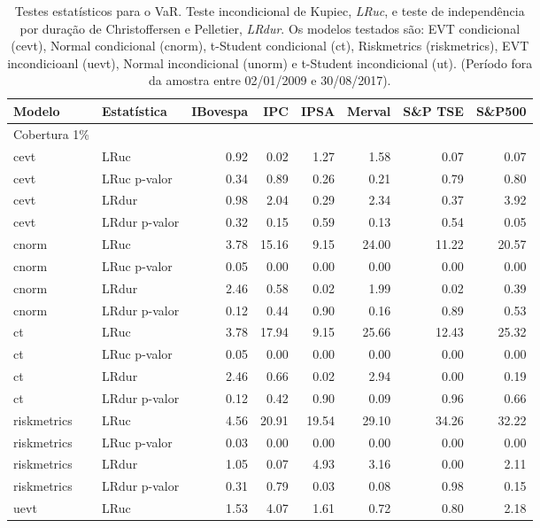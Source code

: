 \begin{longtable}{llrrrrrr}
\caption{Testes estatísticos para o VaR. Teste incondicional de Kupiec, \emph{LRuc}, e teste de
             independência por duração de Christoffersen e Pelletier, \emph{LRdur}. Os modelos testados
são: EVT condicional (cevt), Normal condicional (cnorm), t-Student condicional (ct), Riskmetrics 
(riskmetrics), EVT incondicioanl (uevt), Normal incondicional (unorm) e t-Student incondicional (ut). 
(Período fora da amostra entre 02/01/2009 e 30/08/2017).} \\ 
  \hline
Modelo & Estatística & IBovespa & IPC & IPSA & Merval & S\&P TSE & S\&P500 \\ 
  \hline
Cobertura 1\% &  &  &  &  &  &  &  \\ 
  cevt & LRuc & 0.92 & 0.02 & 1.27 & 1.58 & 0.07 & 0.07 \\ 
  cevt & LRuc p-valor & 0.34 & 0.89 & 0.26 & 0.21 & 0.79 & 0.80 \\ 
  cevt & LRdur & 0.98 & 2.04 & 0.29 & 2.34 & 0.37 & 3.92 \\ 
  cevt & LRdur p-valor & 0.32 & 0.15 & 0.59 & 0.13 & 0.54 & 0.05 \\ 
  cnorm & LRuc & 3.78 & 15.16 & 9.15 & 24.00 & 11.22 & 20.57 \\ 
  cnorm & LRuc p-valor & 0.05 & 0.00 & 0.00 & 0.00 & 0.00 & 0.00 \\ 
  cnorm & LRdur & 2.46 & 0.58 & 0.02 & 1.99 & 0.02 & 0.39 \\ 
  cnorm & LRdur p-valor & 0.12 & 0.44 & 0.90 & 0.16 & 0.89 & 0.53 \\ 
  ct & LRuc & 3.78 & 17.94 & 9.15 & 25.66 & 12.43 & 25.32 \\ 
  ct & LRuc p-valor & 0.05 & 0.00 & 0.00 & 0.00 & 0.00 & 0.00 \\ 
  ct & LRdur & 2.46 & 0.66 & 0.02 & 2.94 & 0.00 & 0.19 \\ 
  ct & LRdur p-valor & 0.12 & 0.42 & 0.90 & 0.09 & 0.96 & 0.66 \\ 
  riskmetrics & LRuc & 4.56 & 20.91 & 19.54 & 29.10 & 34.26 & 32.22 \\ 
  riskmetrics & LRuc p-valor & 0.03 & 0.00 & 0.00 & 0.00 & 0.00 & 0.00 \\ 
  riskmetrics & LRdur & 1.05 & 0.07 & 4.93 & 3.16 & 0.00 & 2.11 \\ 
  riskmetrics & LRdur p-valor & 0.31 & 0.79 & 0.03 & 0.08 & 0.98 & 0.15 \\ 
  uevt & LRuc & 1.53 & 4.07 & 1.61 & 0.72 & 0.80 & 2.18 \\ 

\end{longtable}
